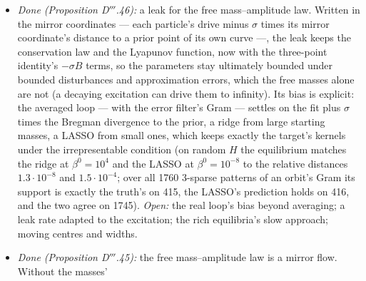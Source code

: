 \begin{enumerate}[label=\arabic*.,leftmargin=*]
\begin{itemize}
      whose sign cannot help die out (exponentially under strict complementarity off the critical curve); the rich limit
      is a sign-constrained basis pursuit, and a pair of opposite particles per atom restores the free sign as a
      hyperbolic entropy. On positive kernel dictionaries the frozen signs make the selection of the target's kernels
      independent of the starting scale, at a speed set by the certificate's margin --- typically tiny on Gaussian grids
      sampled at few points, where the selection is not reached (with 21 atoms, 7 samples and the margin 0.015 the loop
      reaches the target from every start scale, $\beta(0) = 10^{-6}$ to 10, within $6.0\cdot10^{-5}$ at $t = 10^9$;
      over all three-atom supports of three Gaussian grids the median margins are $4.0\cdot10^{-6}$, $3.8\cdot10^{-9}$
      and $1.2\cdot10^{-3}$, and below $10^{-4}$ the loop is still 0.37--0.83 away at $t = 10^9$). \emph{Open:} the
      extinction's rate without strict complementarity; branches in the real loop's slow modes; moving centres on
      branches.
    \item \emph{Done (Proposition D$'''$.46):} a leak for the free mass--amplitude law. Written in the mirror
      coordinates --- each particle's drive minus $\sigma$ times its mirror coordinate's distance to a prior point of
      its own curve ---, the leak keeps the conservation law and the Lyapunov function, now with the three-point
      identity's $-\sigma B$ terms, so the parameters stay ultimately bounded under bounded disturbances and
      approximation errors, which the free masses alone are not (a decaying excitation can drive them to infinity). Its
      bias is explicit: the averaged loop --- with the error filter's Gram --- settles on the fit plus $\sigma$ times the
      Bregman divergence to the prior, a ridge from large starting masses, a LASSO from small ones, which keeps exactly
      the target's kernels under the irrepresentable condition (on random $H$ the equilibrium matches the ridge at
      $\beta^0 = 10^4$ and the LASSO at $\beta^0 = 10^{-8}$ to the relative distances $1.3\cdot10^{-8}$ and
      $1.5\cdot10^{-4}$; over all 1760 3-sparse patterns of an orbit's Gram its support is exactly the truth's on 415,
      the LASSO's prediction holds on 416, and the two agree on 1745). \emph{Open:} the real loop's bias beyond
      averaging; a leak rate adapted to the excitation; the rich equilibria's slow approach; moving centres and widths.
    \item \emph{Done (Proposition D$'''$.45):} the free mass--amplitude law is a mirror flow. Without the masses'

\end{itemize}
\end{enumerate}

